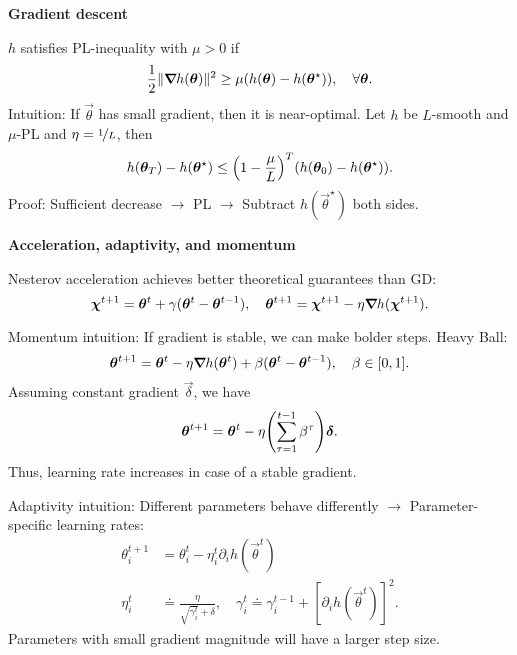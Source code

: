 \documentclass[10pt]{article}
\newenvironment{topic}[1]
{\textbf{\sffamily \colorbox{black}{\rlap{\textbf{\textcolor{white}{#1}}}\hspace{\linewidth}\hspace{-2\fboxsep}}}}
{}
\newenvironment{subtopic}[1]
{\begin{center}\textbf{\sffamily #1}\end{center}}
{}
\begin{document}
\begin{multicols*}{3}
\begin{topic}{Gradient-based learning}
\begin{subtopic}{Gradient descent}
            $h$ satisfies PL-inequality with $\mu > 0$ if \[
                \frac{1}{2} \| \bm{\nabla}_{\! } h(\bm{\theta}) \|^2 \geq \mu (h(\bm{\theta}) - h(\bm{\theta}^\star)), \quad \forall \bm{\theta}.
            \]
            Intuition: If $\vec{\theta}$ has small gradient, then it is near-optimal. Let $h$ be $L$-smooth and
            $\mu$-PL and $\eta = \nicefrac{1}{L}$, then \[
                h(\vec{\theta}_T) - h(\vec{\theta}^\star) \leq \lft( 1 - \frac{\mu}{L} \rgt)^T (h(\vec{\theta}_0) - h(\vec{\theta}^\star)).
            \]
            Proof: Sufficient decrease $\to$ PL $\to$ Subtract $h(\vec{\theta}^\star)$ both sides.
        \end{subtopic}

        \begin{subtopic}{Acceleration, adaptivity, and momentum}
            Nesterov acceleration achieves better theoretical guarantees than GD: \[
                \bm{\chi}^{t+1} = \bm{\theta}^t + \gamma(\bm{\theta}^t - \bm{\theta}^{t-1}), \quad \bm{\theta}^{t+1} = \bm{\chi}^{t+1} - \eta \bm{\nabla}_{\! } h(\bm{\chi}^{t+1}).
            \]

            Momentum intuition: If gradient is stable, we can make bolder steps. Heavy Ball: \[
                \bm{\theta}^{t+1} = \bm{\theta}^t - \eta \bm{\nabla}_{\! } h(\bm{\theta}^t) + \beta (\bm{\theta}^t - \bm{\theta}^{t-1}), \quad \beta \in [0,1].
            \]
            Assuming constant gradient $\vec{\delta}$, we have \[
                \vec{\theta}^{t+1} = \vec{\theta}^t - \eta \lft( \sum_{\tau=1}^{t-1} \beta^{\tau} \rgt) \vec{\delta}.
            \]
            Thus, learning rate increases in case of a stable gradient.

            Adaptivity intuition: Different parameters behave differently $\to$ Parameter-specific learning
            rates:
            \begin{align*}
                \theta_i^{t+1} & = \theta_i^t - \eta_i^t \partial_i h(\vec{\theta}^t) \\
                \eta_i^t & \doteq \frac{\eta}{\sqrt{\gamma_i^t} + \delta}, \quad \gamma_i^t \doteq \gamma_i^{t-1} + [\partial_i h(\vec{\theta}^t)]^2.
            \end{align*}
            Parameters with small gradient magnitude will have a larger step size.


\end{subtopic}
\end{topic}
\end{multicols*}
\end{document}
